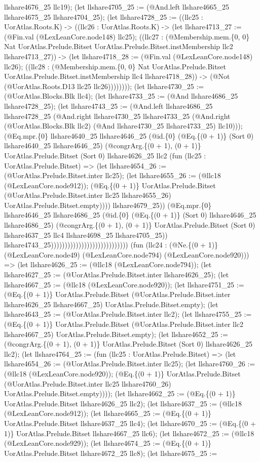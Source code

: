 \documentclass[11pt]{article}
\begin{document}
llshare4676\_25 llc19); (let llshare4705\_25 := (@And.left llshare4665\_25 llshare4675\_25 llshare4704\_25); (let llshare4728\_25 := ((llc25 : UorAtlas.Roots.K) -> ((llc26 : UorAtlas.Roots.K) -> (let llshare4713\_27 := (@Fin.val (@LexLeanCore.node148) llc25); ((llc27 : (@Membership.mem.\{0, 0\} Nat UorAtlas.Prelude.Bitset UorAtlas.Prelude.Bitset.instMembership llc2 llshare4713\_27)) -> (let llshare4718\_28 := (@Fin.val (@LexLeanCore.node148) llc26); ((llc28 : (@Membership.mem.\{0, 0\} Nat UorAtlas.Prelude.Bitset UorAtlas.Prelude.Bitset.instMembership llc4 llshare4718\_28)) -> (@Not (@UorAtlas.Roots.D13 llc25 llc26)))))))); (let llshare4730\_25 := (@UorAtlas.Blocks.Blk llc4); (let llshare4733\_25 := (@And llshare4686\_25 llshare4728\_25); (let llshare4743\_25 := (@And.left llshare4686\_25 llshare4728\_25 (@And.right llshare4730\_25 llshare4733\_25 (@And.right (@UorAtlas.Blocks.Blk llc2) (@And llshare4730\_25 llshare4733\_25) llc10))); (@Eq.mpr.\{0\} llshare4640\_25 llshare4646\_25 (@id.\{0\} (@Eq.\{(0 + 1)\} (Sort 0) llshare4640\_25 llshare4646\_25) (@congrArg.\{(0 + 1), (0 + 1)\} UorAtlas.Prelude.Bitset (Sort 0) llshare4626\_25 llc2 (fun (llc25 : UorAtlas.Prelude.Bitset) => (let llshare4654\_26 := (@UorAtlas.Prelude.Bitset.inter llc25); (let llshare4655\_26 := (@llc18 (@LexLeanCore.node912)); (@Eq.\{(0 + 1)\} UorAtlas.Prelude.Bitset (@UorAtlas.Prelude.Bitset.inter llc25 llshare4655\_26) UorAtlas.Prelude.Bitset.empty)))) llshare4679\_25)) (@Eq.mpr.\{0\} llshare4646\_25 llshare4686\_25 (@id.\{0\} (@Eq.\{(0 + 1)\} (Sort 0) llshare4646\_25 llshare4686\_25) (@congrArg.\{(0 + 1), (0 + 1)\} UorAtlas.Prelude.Bitset (Sort 0) llshare4637\_25 llc4 llshare4698\_25 llshare4705\_25)) llshare4743\_25)))))))))))))))))))))))))))) (fun (llc24 : (@Ne.\{(0 + 1)\} (@LexLeanCore.node49) (@LexLeanCore.node794) (@LexLeanCore.node920))) => (let llshare4626\_25 := (@llc18 (@LexLeanCore.node794)); (let llshare4627\_25 := (@UorAtlas.Prelude.Bitset.inter llshare4626\_25); (let llshare4667\_25 := (@llc18 (@LexLeanCore.node920)); (let llshare4751\_25 := (@Eq.\{(0 + 1)\} UorAtlas.Prelude.Bitset (@UorAtlas.Prelude.Bitset.inter llshare4626\_25 llshare4667\_25) UorAtlas.Prelude.Bitset.empty); (let llshare4643\_25 := (@UorAtlas.Prelude.Bitset.inter llc2); (let llshare4755\_25 := (@Eq.\{(0 + 1)\} UorAtlas.Prelude.Bitset (@UorAtlas.Prelude.Bitset.inter llc2 llshare4667\_25) UorAtlas.Prelude.Bitset.empty); (let llshare4652\_25 := (@congrArg.\{(0 + 1), (0 + 1)\} UorAtlas.Prelude.Bitset (Sort 0) llshare4626\_25 llc2); (let llshare4764\_25 := (fun (llc25 : UorAtlas.Prelude.Bitset) => (let llshare4654\_26 := (@UorAtlas.Prelude.Bitset.inter llc25); (let llshare4760\_26 := (@llc18 (@LexLeanCore.node920)); (@Eq.\{(0 + 1)\} UorAtlas.Prelude.Bitset (@UorAtlas.Prelude.Bitset.inter llc25 llshare4760\_26) UorAtlas.Prelude.Bitset.empty)))); (let llshare4662\_25 := (@Eq.\{(0 + 1)\} UorAtlas.Prelude.Bitset llshare4626\_25 llc2); (let llshare4637\_25 := (@llc18 (@LexLeanCore.node912)); (let llshare4665\_25 := (@Eq.\{(0 + 1)\} UorAtlas.Prelude.Bitset llshare4637\_25 llc4); (let llshare4670\_25 := (@Eq.\{(0 + 1)\} UorAtlas.Prelude.Bitset llshare4667\_25 llc6); (let llshare4672\_25 := (@llc18 (@LexLeanCore.node929)); (let llshare4674\_25 := (@Eq.\{(0 + 1)\} UorAtlas.Prelude.Bitset llshare4672\_25 llc8); (let llshare4675\_25 := 
\end{document}
